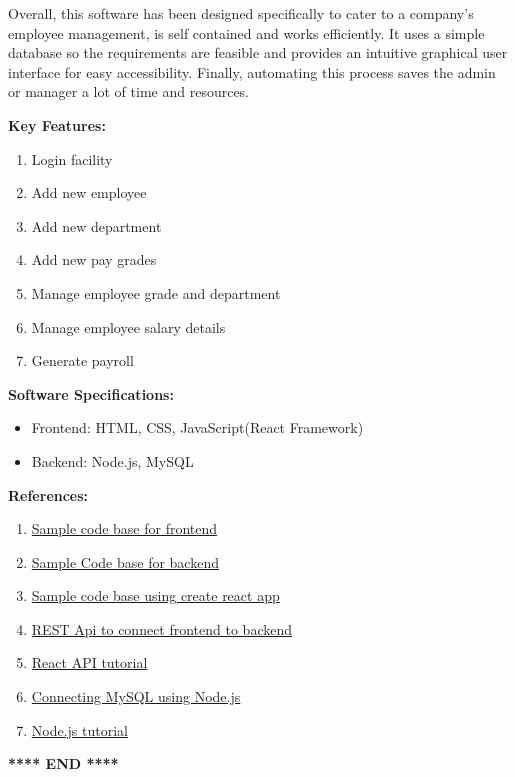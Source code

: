 \documentclass[12pt]{article}
\begin{document}
\noindent
Overall, this software has been designed specifically to cater to a company's employee management, is self contained and works efficiently. It uses a simple database so the requirements are feasible and provides an intuitive graphical user interface for easy accessibility. Finally, automating this process saves the admin or manager a lot of time and resources. 

\noindent
\textbf{Key Features:}
\begin{enumerate}
    \item Login facility
    \item Add new employee
    \item Add new department
    \item Add new pay grades
    \item Manage employee grade and department
    \item Manage employee salary details
    \item Generate payroll
\end{enumerate}
\textbf{Software Specifications:}
\begin{itemize}
    \item Frontend: HTML, CSS, JavaScript(React Framework) 
    \item Backend: Node.js, MySQL
\end{itemize}

\noindent
\textbf{References:}
\begin{enumerate}
    \item\href{https://github.com/fenil29/employee-management-system-frontend-react}{Sample code base for frontend}
    \item\href{https://github.com/fenil29/employee-management-system-backend-node}{Sample Code base for backend}
    \item\href{https://github.com/silentarrowz/payroll-react}{Sample code base using create react app}
    \item\href{https://medium.com/valtech-ch/setup-a-rest-api-with-sequelize-and-express-js-fae06d08c0a7}{REST Api to connect frontend to backend}
    \item\href{https://reactjs.org/tutorial/tutorial.html}{React API tutorial}
    \item\href{https://www.mysqltutorial.org/mysql-nodejs/connect/}{Connecting MySQL using Node.js}
    \item\href{https://www.w3schools.com/nodejs/}{Node.js tutorial}
    
\end{enumerate}

\begin{center}
    \textbf{**** END ****}
\end{center}
\end{document}

